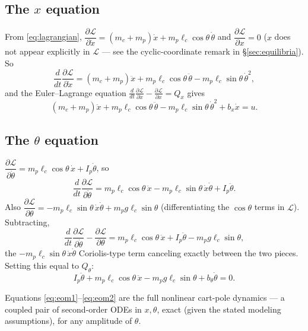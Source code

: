 \documentclass[11pt]{article}
\begin{document}
\subsection{The $x$ equation}
From \eqref{eq:lagrangian}, $\dfrac{\partial\mathcal L}{\partial\dot x} =
(m_c+m_p)\dot x + m_p\ell_c\cos\theta\,\dot\theta$ and
$\dfrac{\partial\mathcal L}{\partial x}=0$ ($x$ does not appear
explicitly in $\mathcal L$ — see the cyclic-coordinate remark in
\S\ref{sec:equilibria}). So
\[
  \frac{d}{dt}\frac{\partial\mathcal L}{\partial\dot x} =
  (m_c+m_p)\ddot x + m_p\ell_c\cos\theta\,\ddot\theta
  - m_p\ell_c\sin\theta\,\dot\theta^2,
\]
and the Euler--Lagrange equation
$\frac{d}{dt}\frac{\partial\mathcal L}{\partial\dot x} -
\frac{\partial\mathcal L}{\partial x} = Q_x$ gives
\begin{equation}
  (m_c+m_p)\ddot x + m_p\ell_c\cos\theta\,\ddot\theta
  - m_p\ell_c\sin\theta\,\dot\theta^2 + b_x\dot x = u. \label{eq:eom1}
\end{equation}

\subsection{The $\theta$ equation}
$\dfrac{\partial\mathcal L}{\partial\dot\theta} = m_p\ell_c\cos\theta\,
\dot x + I_p\dot\theta$, so
\[
  \frac{d}{dt}\frac{\partial\mathcal L}{\partial\dot\theta} =
  m_p\ell_c\cos\theta\,\ddot x - m_p\ell_c\sin\theta\,\dot x\dot\theta
  + I_p\ddot\theta.
\]
Also $\dfrac{\partial\mathcal L}{\partial\theta} = -m_p\ell_c\sin\theta\,
\dot x\dot\theta + m_p g\ell_c\sin\theta$ (differentiating the $\cos\theta$
terms in $\mathcal L$). Subtracting,
\[
  \frac{d}{dt}\frac{\partial\mathcal L}{\partial\dot\theta}
  - \frac{\partial\mathcal L}{\partial\theta} =
  m_p\ell_c\cos\theta\,\ddot x + I_p\ddot\theta - m_p g\ell_c\sin\theta,
\]
the $-m_p\ell_c\sin\theta\,\dot x\dot\theta$ Coriolis-type term canceling
exactly between the two pieces. Setting this equal to $Q_\theta$:
\begin{equation}
  I_p\ddot\theta + m_p\ell_c\cos\theta\,\ddot x
  - m_p g\ell_c\sin\theta + b_\theta\dot\theta = 0. \label{eq:eom2}
\end{equation}

Equations \eqref{eq:eom1}--\eqref{eq:eom2} are the full nonlinear cart-pole
dynamics — a coupled pair of second-order ODEs in $x,\theta$, exact (given
the stated modeling assumptions), for any amplitude of $\theta$.
\end{document}
